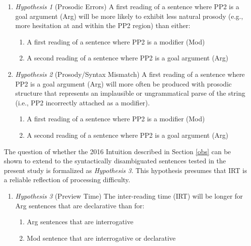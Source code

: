 \documentclass[11pt,oneside]{book}
\providecommand{\tightlist}{%
  \setlength{\itemsep}{0pt}\setlength{\parskip}{0pt}}
\begin{document}
\begin{enumerate}
\def\labelenumi{(\arabic{enumi})}
\setcounter{enumi}{28}
\tightlist
\item
  \emph{Hypothesis 1} (Prosodic Errors)\linebreak\nopagebreak
  A first reading of a sentence where PP2 is a goal argument (Arg) will be more likely to exhibit less natural prosody (e.g., more hesitation at and within the PP2 region) than either:

  \begin{enumerate}
  \def\labelenumii{\alph{enumii}.}
  \tightlist
  \item
    A first reading of a sentence where PP2 is a modifier (Mod)
  \item
    A second reading of a sentence where PP2 is a goal argument (Arg)
  \end{enumerate}
\item
  \emph{Hypothesis 2} (Prosody/Syntax Mismatch)\linebreak\nopagebreak
  A first reading of a sentence where PP2 is a goal argument (Arg) will more often be produced with prosodic structure that represents an implausible or ungrammatical parse of the string (i.e., PP2 incorrectly attached as a modifier).

  \begin{enumerate}
  \def\labelenumii{\alph{enumii}.}
  \tightlist
  \item
    A first reading of a sentence where PP2 is a modifier (Mod)
  \item
    A second reading of a sentence where PP2 is a goal argument (Arg)
  \end{enumerate}
\end{enumerate}

The question of whether the 2016 Intuition described in Section \ref{obs} can be shown to extend to the syntactically disambiguated sentences tested in the present study is formalized as \emph{Hypothesis 3}. This hypothesis presumes that IRT is a reliable reflection of processing difficulty.

\begin{enumerate}
\def\labelenumi{(\arabic{enumi})}
\setcounter{enumi}{30}
\tightlist
\item
  \emph{Hypothesis 3} (Preview Time) \linebreak\nopagebreak
  The inter-reading time (IRT) will be longer for Arg sentences that are declarative than for:

  \begin{enumerate}
  \def\labelenumii{\alph{enumii}.}
  \tightlist
  \item
    Arg sentences that are interrogative
  \item
    Mod sentence that are interrogative or declarative
  \end{enumerate}
\end{enumerate}
\end{document}
